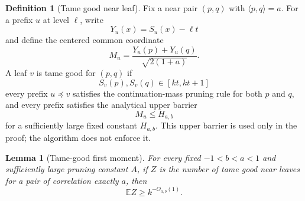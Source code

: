 \documentclass[10pt]{article}
\newtheorem{lemma}[theorem]{Lemma}
\theoremstyle{definition}
\newtheorem{definition}[theorem]{Definition}
\newcommand{\E}{\mathbb{E}}
\newcommand{\ip}[2]{\langle #1,#2\rangle}
\begin{document}
\begin{definition}[Tame good near leaf]\label{def:good-near-leaf}
   Fix a near pair $(p,q)$ with $\ip{p}{q}=a$. For a prefix $u$ at level $\ell$, write
   \[
      Y_u(x)=S_u(x)-\ell t
   \]
   and define the centered common coordinate
   \[
      M_u=\frac{Y_u(p)+Y_u(q)}{\sqrt{2(1+a)}}.
   \]
   A leaf $v$ is tame good for $(p,q)$ if
   \[
      S_v(p),S_v(q)\in[kt,kt+1]
   \]
   every prefix $u\preceq v$ satisfies the continuation-mass pruning rule for both $p$ and $q$, and every prefix satisfies the analytical upper barrier
   \[
      M_u\le H_{a,b}
   \]
   for a sufficiently large fixed constant $H_{a,b}$. This upper barrier is used only in the proof; the algorithm does not enforce it.
\end{definition}

\begin{lemma}[Tame-good first moment]\label{lem:good-first-moment}
   For every fixed $-1<b<a<1$ and sufficiently large pruning constant $A$, if $Z$ is the number of tame good near leaves for a pair of correlation exactly $a$, then
   \[
      \E Z\ge k^{-O_{a,b}(1)}.
   \]
\end{lemma}
\end{document}
